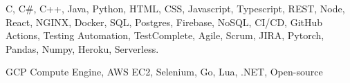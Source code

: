 \documentclass[11pts]{article}
\begin{document}


\smallskip


\smallskip

C, C\#, C++, Java, Python, HTML, CSS, Javascript, Typescript, REST, Node, React, NGINX, Docker,
SQL, Postgres, Firebase, NoSQL, CI/CD, GitHub Actions, Testing Automation, TestComplete, Agile, Scrum, JIRA,
Pytorch, Pandas, Numpy, Heroku, Serverless.
\smallskip

GCP Compute Engine, AWS EC2, Selenium, Go, Lua, .NET, Open-source
\end{document}
